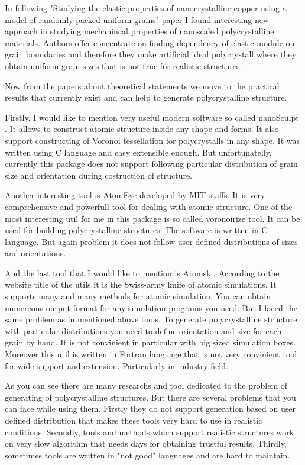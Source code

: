\documentclass{article}
\begin{document}
In following "Studying the elastic properties of nanocrystalline copper using a model of randomly packed uniform grains" \cite{guo13} paper I found interesting new approach in studying mechanincal properties of nanoscaled polycrystalline materials. Authors offer concentrate on finding dependency of elastic module on grain boundaries and therefore they make artificial ideal polycrystall where they obtain uniform grain sizes that is not true for realistic structures.

Now from the papers about theoretical statements we move to the practical results that currently exist and can help to generate polycrystalline structure.

Firstly, I would like to mention very useful modern software so called nanoSculpt \cite{prak16}. It allows to construct atomic structure inside any shape and forms. It also support constructing of Voronoi tessellation for polycrystalls in any shape. It was written using C language and easy extensible enough. But unfortunatelly, currently this package does not support following particular distribution of grain size and orientation during costruction of structure. 

Another interesting tool is AtomEye \cite{juli03} developed by MIT staffs. It is very comprehensive and powerfull tool for dealing with atomic structure. One of the most interesting util for me in this package is so called voronoirize tool. It can be used for building polycrystalline structures. The software is written in C language. But again problem it does not follow user defined distributions of sizes and orientations. 

And the last tool that I would like to mention is Atomsk \cite{hirel15}. According to the website title of the utils it is the Swiss-army knife of atomic simulations. It supports many and many methods for atomic simulation. You can obtain numereous output format for any simulation programs you need. But I faced the same problem as in mentioned above tools. To generate polycrystalline structure with particular distributions you need to define orientation and size for each grain by hand. It is not convinient in particular with big sized simulation boxes. Moreover this util is written in Fortran language that is not very convinient tool for wide support and extension. Particularly in industry field.

As you can see there are many researchs and tool dedicated to the problem of generating of polycrystalline structures. But there are several problems that you can face while using them. Firstly they do not support generation based on user defined distribution that makes these tools very hard to use in realistic conditions. Secondly, tools and methods which support realistic structures work on very slow algorithm that needs days for obtaining trustful results. Thirdly, sometimes tools are written in "not good" languages and are hard to maintain.
\end{document}
